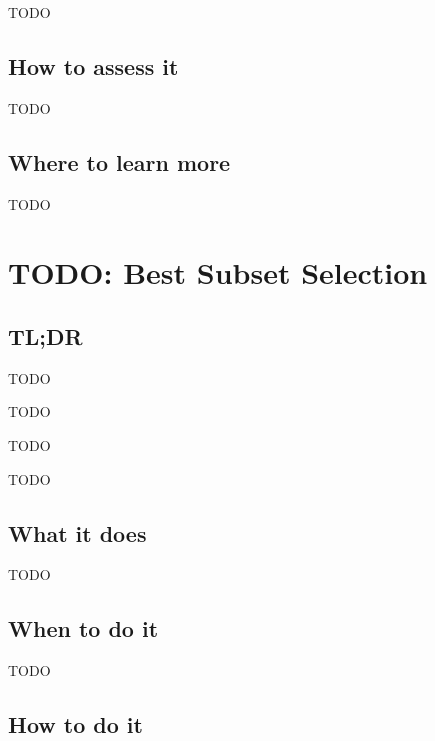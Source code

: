 \documentclass[
]{book}
\providecommand{\tightlist}{%
  \setlength{\itemsep}{0pt}\setlength{\parskip}{0pt}}
\begin{document}
TODO

\hypertarget{how-to-assess-it-9}{%
\section{How to assess it}\label{how-to-assess-it-9}}

TODO

\hypertarget{where-to-learn-more-9}{%
\section{Where to learn more}\label{where-to-learn-more-9}}

TODO

\hypertarget{best-subset-selection}{%
\chapter{TODO: Best Subset Selection}\label{best-subset-selection}}

\hypertarget{tldr-10}{%
\section{TL;DR}\label{tldr-10}}

\begin{description}
\tightlist
\item[What it does]
TODO
\item[When to do it]
TODO
\item[How to do it]
TODO
\item[How to assess it]
TODO
\end{description}

\hypertarget{what-it-does-10}{%
\section{What it does}\label{what-it-does-10}}

TODO

\hypertarget{when-to-do-it-10}{%
\section{When to do it}\label{when-to-do-it-10}}

TODO

\hypertarget{how-to-do-it-10}{%
\section{How to do it}\label{how-to-do-it-10}}
\end{document}
